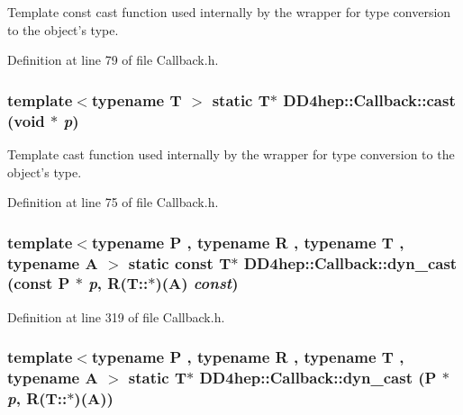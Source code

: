 Template const cast function used internally by the wrapper for type conversion to the object's type. 

Definition at line 79 of file Callback.h.\hypertarget{class_d_d4hep_1_1_callback_a069516d5f7974c49d2cef9f8f5d3a3a8}{
\subsubsection[{cast}]{\setlength{\rightskip}{0pt plus 5cm}template$<$typename T $>$ static {\bf T}$\ast$ DD4hep::Callback::cast (void $\ast$ {\em p})}}
\label{class_d_d4hep_1_1_callback_a069516d5f7974c49d2cef9f8f5d3a3a8}


Template cast function used internally by the wrapper for type conversion to the object's type. 

Definition at line 75 of file Callback.h.\hypertarget{class_d_d4hep_1_1_callback_a21c30142836304bb1442482199485133}{
\subsubsection[{dyn\_\-cast}]{\setlength{\rightskip}{0pt plus 5cm}template$<$typename P , typename R , typename T , typename A $>$ static const {\bf T}$\ast$ DD4hep::Callback::dyn\_\-cast (const P $\ast$ {\em p}, \/  R(T::$\ast$)(A) {\em const})}}
\label{class_d_d4hep_1_1_callback_a21c30142836304bb1442482199485133}


Definition at line 319 of file Callback.h.\hypertarget{class_d_d4hep_1_1_callback_aae546798486b2d6a31d0cfc8aee92b9c}{
\subsubsection[{dyn\_\-cast}]{\setlength{\rightskip}{0pt plus 5cm}template$<$typename P , typename R , typename T , typename A $>$ static {\bf T}$\ast$ DD4hep::Callback::dyn\_\-cast (P $\ast$ {\em p}, \/  R(T::$\ast$)(A))}}
\label{class_d_d4hep_1_1_callback_aae546798486b2d6a31d0cfc8aee92b9c}


